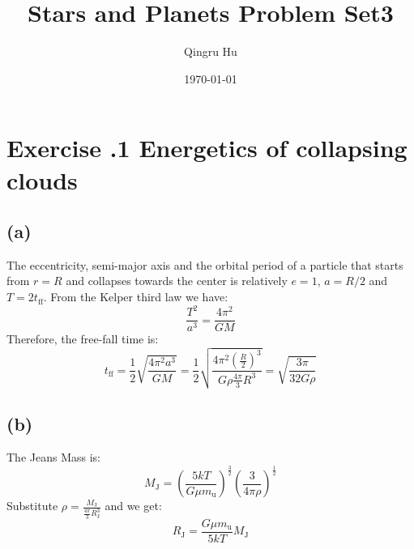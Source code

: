 \documentclass[a4paper,12pt]{article}
\title{\textbf{Stars and Planets Problem Set3}}
\author{Qingru Hu}
\date{\today}
\begin{document}
\maketitle
\section*{\textbf{Exercise \uppercase\expandafter{}.1  Energetics of collapsing clouds}}
\subsection*{(a)}
The eccentricity, semi-major axis and the orbital period of a particle that starts from $r=R$ and 
collapses towards the center is relatively $e=1$, $a=R/2$ and $T=2t_{\text{ff}}$. From the Kelper 
third law we have:
\begin{equation*}
    \frac{T^2}{a^3} = \frac{4\pi^2}{GM}
\end{equation*}
Therefore, the free-fall time is:
\begin{equation*}
    t_{\text{ff}} = \frac{1}{2} \sqrt{\frac{4\pi^2 a^3}{G M}} 
    = \frac{1}{2} \sqrt{\frac{4\pi^2 (\frac{R}{2})^3}{G \rho \frac{4\pi}{3} R^3}}
    = \sqrt{\frac{3\pi}{32 G\rho}}
\end{equation*}

\subsection*{(b)}
The Jeans Mass is:
\begin{equation*}
    M_\text{J} = (\frac{5kT}{G\mu m_\text{u}})^{\frac{3}{2}} (\frac{3}{4\pi \rho})^{\frac{1}{2}}
\end{equation*}
Substitute $\rho = \frac{M_\text{J}}{\frac{4\pi}{3} R^3_\text{J}}$ and we get:
\begin{equation*}
    R_{\text{J}} = \frac{G\mu m_\text{u}}{5kT} M_\text{J}
\end{equation*}
\end{document}
